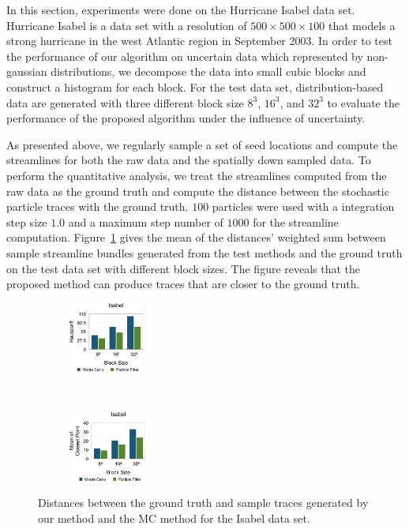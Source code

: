 In this section, experiments were done on the Hurricane Isabel data set. Hurricane Isabel is a data set with a resolution of $500 \times 500 \times 100$ that models a strong hurricane in the west Atlantic region in September 2003. In order to test the performance of our algorithm on uncertain data which represented by non-gaussian distributions, we decompose the data into small cubic blocks and construct a histogram for each block. For the test data set, distribution-based data are generated with three different block size $8^3$, $16^3$, and $32^3$ to evaluate the performance of the proposed algorithm under the influence of uncertainty.

As presented above, we regularly sample a set of seed locations and compute the streamlines for both the raw data and the spatially down sampled data. To perform the quantitative analysis, we treat the streamlines computed from the raw data as the ground truth and compute the distance between the stochastic particle traces with the ground truth. $100$ particles were used with a integration step size $1.0$ and a maximum step number of $1000$ for the streamline computation. Figure~\ref{berror_r} gives the mean of the distances' weighted sum between sample streamline bundles generated from the test methods and the ground truth on the test data set with different block sizes. The figure reveals that the proposed method can produce traces that are closer to the ground truth.

\begin{figure}[!htb]
  \centering
  \begin{subfigure}[b]{0.24\textwidth}
    \centering
    \includegraphics[height=0.9in]{../figures/isabel_h.eps}
  \end{subfigure}~
  \begin{subfigure}[b]{0.24\textwidth}
    \centering
    \includegraphics[height=0.9in]{../figures/isabel_m.eps}
  \end{subfigure}
  \caption{Distances between the ground truth and sample traces generated by our method and the MC method for the Isabel data set.}
  \label{berror_r}
\end{figure}

